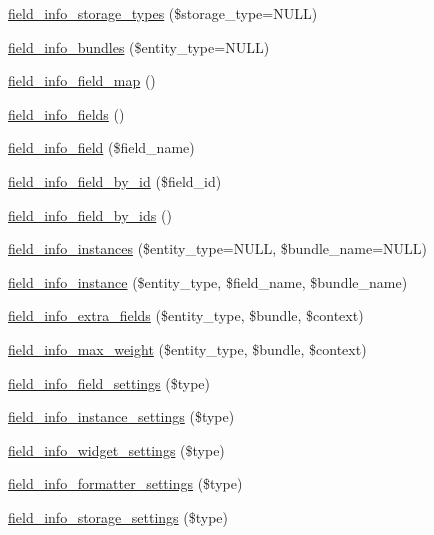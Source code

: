 \begin{DoxyCompactItemize}
\item 
\hyperlink{group__field__info_ga1c47f34b9ccd36dd29cf6059a270573b}{field\_\-info\_\-storage\_\-types} (\$storage\_\-type=NULL)
\item 
\hyperlink{group__field__info_ga256e760ea91818bb5463deb91c8f5c57}{field\_\-info\_\-bundles} (\$entity\_\-type=NULL)
\item 
\hyperlink{group__field__info_gacb01ef76f6e24f61dbd2ae56c44f7eee}{field\_\-info\_\-field\_\-map} ()
\item 
\hyperlink{group__field__info_ga48e54378f3609753346fea1f7f3e7a2c}{field\_\-info\_\-fields} ()
\item 
\hyperlink{group__field__info_ga74cfc942cd2baa5c49780b08c5d357d4}{field\_\-info\_\-field} (\$field\_\-name)
\item 
\hyperlink{group__field__info_ga901d91feefc6639d0ad97289ae472523}{field\_\-info\_\-field\_\-by\_\-id} (\$field\_\-id)
\item 
\hyperlink{group__field__info_ga56b4320178a4409663a3de20b2483e99}{field\_\-info\_\-field\_\-by\_\-ids} ()
\item 
\hyperlink{group__field__info_ga6881d157e9e37472626dbefe406032f4}{field\_\-info\_\-instances} (\$entity\_\-type=NULL, \$bundle\_\-name=NULL)
\item 
\hyperlink{group__field__info_ga7d4361ece7a9a8be980e3fd4a6307564}{field\_\-info\_\-instance} (\$entity\_\-type, \$field\_\-name, \$bundle\_\-name)
\item 
\hyperlink{group__field__info_gae66c2dc5b6bdb9560a0561cefcf093f7}{field\_\-info\_\-extra\_\-fields} (\$entity\_\-type, \$bundle, \$context)
\item 
\hyperlink{group__field__info_ga4761d1f619b3492edd9b133ae63c850b}{field\_\-info\_\-max\_\-weight} (\$entity\_\-type, \$bundle, \$context)
\item 
\hyperlink{group__field__info_ga2841dd4cdcc4099f7995ddc801382b93}{field\_\-info\_\-field\_\-settings} (\$type)
\item 
\hyperlink{group__field__info_gacc329d37a5cdf35417a3415d9686f37a}{field\_\-info\_\-instance\_\-settings} (\$type)
\item 
\hyperlink{group__field__info_gabc6b57b8aa806a133ebe2f2e7db1712f}{field\_\-info\_\-widget\_\-settings} (\$type)
\item 
\hyperlink{group__field__info_gabc16935f6edb0f6dd404f75cccd3fe8c}{field\_\-info\_\-formatter\_\-settings} (\$type)
\item 
\hyperlink{group__field__info_ga378368be6e00368074e604c4185f1b4b}{field\_\-info\_\-storage\_\-settings} (\$type)
\end{DoxyCompactItemize}


